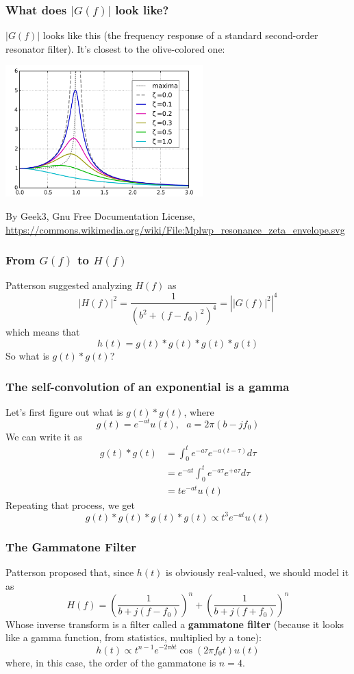\begin{frame}
  \frametitle{What does $|G(f)|$ look like?}

  $|G(f)|$ looks like this (the frequency response of a standard second-order
  resonator filter). It's closest to the olive-colored one:

  \centerline{\includegraphics[height=2in]{Mplwp_resonance_zeta_envelope.png}}
  \begin{tiny}
    By Geek3, Gnu Free Documentation License,
    \url{https://commons.wikimedia.org/wiki/File:Mplwp_resonance_zeta_envelope.svg}
  \end{tiny}
\end{frame}

\begin{frame}
  \frametitle{From $G(f)$ to $H(f)$}

  Patterson suggested analyzing $H(f)$ as
  \[
  |H(f)|^2 = \frac{1}{(b^2+(f-f_0)^2)^4}= \left||G(f)|^2\right|^4
  \]
  which means that
  \[
  h(t) = g(t)\ast g(t)\ast g(t)\ast g(t)
  \]
  So what is $g(t)\ast g(t)$?
\end{frame}

\begin{frame}
  \frametitle{The self-convolution of an exponential is  a gamma}

  Let's first figure out what is $g(t)\ast g(t)$, where 
  \[
  g(t)=e^{-at}u(t),~~~a=2\pi (b-jf_0)
  \]
  We can write it as
  \begin{align*}
    g(t)\ast g(t) &= \int_0^t e^{-a\tau} e^{-a(t-\tau)} d\tau\\
    &= e^{-at} \int_0^t e^{-a\tau} e^{+a\tau} d\tau\\
    &= te^{-at} u(t)
  \end{align*}
  Repeating that process, we get
  \[
  g(t)\ast g(t)\ast g(t)\ast g(t) \propto t^3 e^{-at}u(t)
  \]
\end{frame}

\begin{frame}
  \frametitle{The Gammatone Filter}

  Patterson proposed that, since $h(t)$ is obviously real-valued, we
  should model it as
  \[
  H(f) = \left(\frac{1}{b + j(f-f_0)}\right)^n + \left(\frac{1}{b + j(f+f_0)}\right)^n
  \]
  Whose inverse transform is a filter called a {\bf gammatone filter}
  (because it looks like a gamma function, from statistics, multiplied
  by a tone):
  \[
  h(t) \propto t^{n-1} e^{-2\pi bt}\cos(2\pi f_0 t)u(t)
  \]
  where, in this case, the order of the gammatone is $n=4$.
\end{frame}

